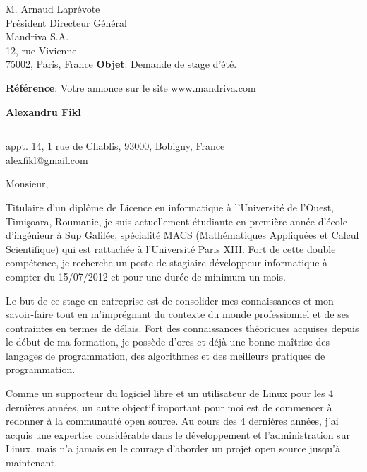 \documentclass{letter}
\begin{document}
\signature{Alexandru Fikl}           		 %
\longindentation=0pt                       %
\let\raggedleft\raggedright                %


\begin{letter}{M. Arnaud Laprévote \\
Président Directeur Général \\
Mandriva S.A. \\
12, rue Vivienne \\
75002, Paris, France
\newline
\newline
\newline
\textbf{Objet}: Demande de stage d'\'et\'e.

\textbf{Référence}: Votre annonce sur le site www.mandriva.com}

\begin{flushleft}
{\huge\textbf{Alexandru Fikl}}
\end{flushleft}
\medskip\hrule height 1pt

\begin{flushright}
\hfill appt. 14, 1 rue de Chablis, 93000, Bobigny, France \\
\hfill alexfikl@gmail.com
\end{flushright}

\vfill

\opening{Monsieur,}

\hbox{}

Titulaire d'un diplôme de Licence en informatique à l'Université
de l'Ouest, Timi\c{s}oara, Roumanie, je suis actuellement étudiante en première année d'école
d'ingénieur à Sup Galilée, spécialité MACS (Mathématiques Appliquées et Calcul
Scientifique) qui  est rattachée à l'Université Paris XIII. Fort de cette double
compétence, je recherche un poste de stagiaire développeur informatique \`a compter du
15/07/2012 et pour une durée de minimum un mois.

Le but de ce stage en entreprise est de consolider mes connaissances et mon
savoir-faire tout en m'imprégnant du contexte du monde professionnel et de ses
contraintes en termes de délais. Fort des connaissances théoriques acquises depuis
le début de ma formation, je possède d'ores et déjà une bonne maîtrise des langages
de programmation, des algorithmes et des meilleurs pratiques de programmation.

Comme un supporteur du logiciel libre et un utilisateur de Linux pour les 4 dernières
années, un autre objectif important pour moi est de commencer à redonner à la
communauté open source. Au cours des 4 dernières années, j'ai acquis une expertise
considérable dans le développement et l'administration sur Linux, mais n'a jamais
eu le courage d'aborder un projet open source jusqu'à maintenant.


\end{letter}
\end{document}
